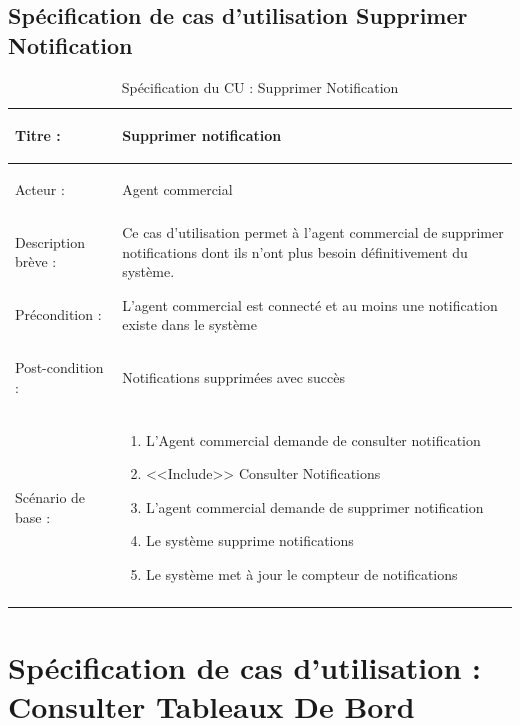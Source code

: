 \newpage
\subsection{Spécification de cas d'utilisation Supprimer Notification}

\begin{longtable}{|>{\bfseries\raggedright\arraybackslash}p{3.5cm}|p{\dimexpr\textwidth-3.5cm-4\tabcolsep-2\arrayrulewidth}|}
\hline
Titre : & Supprimer notification \\
\hline
Acteur : & Agent commercial \\
\hline
Description brève : & Ce cas d'utilisation permet à l'agent commercial de supprimer notifications dont ils n'ont plus besoin définitivement du système. \\
\hline
Précondition : & L'agent commercial est connecté et au moins une notification existe dans le système \\
\hline
Post-condition : & Notifications supprimées avec succès \\
\hline
Scénario de base : &
\begin{enumerate}[leftmargin=1.5em, topsep=2pt, itemsep=1pt]
  \item L'Agent commercial demande de consulter notification
  \item <<Include>> Consulter Notifications
  \item L'agent commercial demande de supprimer notification
  \item Le système supprime notifications
  \item Le système met à jour le compteur de notifications
\end{enumerate} \\
\hline
\caption{Spécification du CU : Supprimer Notification}
\label{tab:cu-supprimer-notif}
\end{longtable}

\newpage
{}
\section{Spécification de cas d'utilisation : Consulter Tableaux De Bord}

